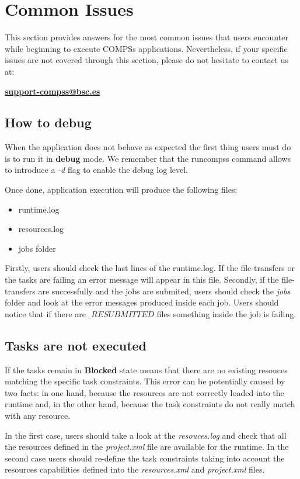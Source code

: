 \section{Common Issues}
\label{sec:Common_Issues}

This section provides answers for the most common issues that users encounter while beginning to execute COMPSs applications.
Nevertheless, if your specific issues are not covered through this section, please do not hesitate to contact us at:
\begin{center}
  \textbf{\url{support-compss@bsc.es}}
\end{center}

\subsection{How to debug}
When the application does not behave as expected the first thing users must do is to run it in \textbf{debug} mode. We remember that
the runcompss command allows to introduce a \textit{-d} flag to enable the debug log level.

Once done, application execution will produce the following files:
\begin{itemize}
 \item runtime.log
 \item resources.log
 \item jobs folder
\end{itemize}

Firstly, users should check the last lines of the runtime.log. If the file-transfers or the tasks are failing an error message 
will appear in this file. 
Secondly, if the file-transfers are successfully and the jobs are submited, users should check the \textit{jobs} folder and look 
at the error messages produced inside each job. Users should notice that if there are $\_RESUBMITTED$ files something 
inside the job is failing.

\subsection{Tasks are not executed}
If the tasks remain in \textbf{Blocked} state means that there are no existing resouces matching the specific task constraints. 
This error can be potentially caused by two facts: in one hand, because the resources are not correctly loaded into the runtime
and, in the other hand, because the task constraints do not really match with any resource. 

In the first case, users should take a look at the \textit{resouces.log} and check that all the resources
defined in the \textit{project.xml} file are available for the runtime. In the second case users should re-define the task 
constraints taking into account the resources capabilities defined into the \textit{resources.xml} and \textit{project.xml} files.


